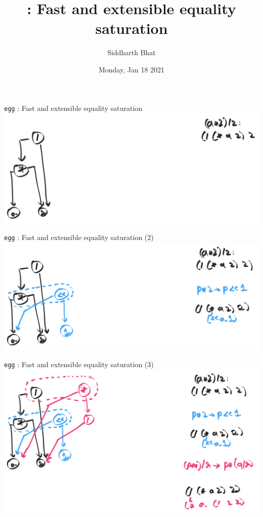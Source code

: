 \documentclass[8pt]{beamer}
\author{Siddharth Bhat}
\date{Monday, Jan 18 2021}
\title{\egg: Fast and extensible equality saturation}
\newcommand{\egg}{\texttt{egg} }
\begin{document}


\maketitle

\begin{frame}[fragile]{\egg: Fast and extensible equality saturation}
\includegraphics[width=\textwidth]{./eg-1-1.png}
\end{frame}

\begin{frame}[fragile]{\egg: Fast and extensible equality saturation (2)}
\includegraphics[width=\textwidth]{./eg-1-2.png}
\end{frame}


\begin{frame}[fragile]{\egg: Fast and extensible equality saturation (3)}
\includegraphics[width=\textwidth]{./eg-1-3.png}
\end{frame}
\end{document}
